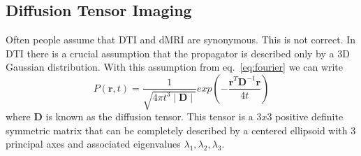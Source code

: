 \documentclass{bioinfo}
\begin{document}


\subsection{Diffusion Tensor Imaging}\label{dti}

Often people assume that DTI and dMRI are synonymous. This is not correct. In DTI there is a crucial assumption that the propagator is described only by a 3D Gaussian distribution. With this assumption from eq.~\ref{eq:fourier} we can write
\begin{equation}
P(\mathbf{r},t)=\frac{1}{\sqrt{4\pi t^{3}\mid\mathbf{D}\mid}}exp(-\frac{\mathbf{r}^{T}\mathbf{D}^{-1}\mathbf{r}}{4t})
\end{equation}
\noindent where $\mathbf{D}$ is known as the diffusion tensor. This tensor is a $3x3$ positive definite symmetric matrix that can be completely described by a centered ellipsoid with 3 principal axes and associated eigenvalues $\lambda_{1},\lambda_{2},\lambda_{3}$.
\end{document}
